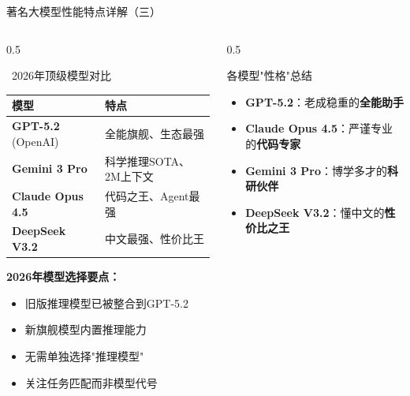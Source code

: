 \documentclass[aspectratio=169,11pt]{beamer}
\begin{document}
\begin{frame}{著名大模型性能特点详解（三）}
    \begin{columns}
        \begin{column}{0.5\textwidth}
            \begin{block}{\faFire\ 2026年顶级模型对比}
                \footnotesize
                \begin{tabular}{p{2.2cm}p{2.5cm}}
                    \toprule
                    \textbf{模型} & \textbf{特点} \\
                    \midrule
                    \textbf{GPT-5.2} (OpenAI) & 全能旗舰、生态最强 \\
                    \textbf{Gemini 3 Pro} & 科学推理SOTA、2M上下文 \\
                    \textbf{Claude Opus 4.5} & 代码之王、Agent最强 \\
                    \textbf{DeepSeek V3.2} & 中文最强、性价比王 \\
                    \bottomrule
                
                \end{tabular}
                \normalsize
                
                \vspace{0.3cm}
                \textbf{2026年模型选择要点：}
                \begin{itemize}
                    \item 旧版推理模型已被整合到GPT-5.2
                    \item 新旗舰模型内置推理能力
                    \item 无需单独选择"推理模型"
                    \item 关注任务匹配而非模型代号
                \end{itemize}
            \end{block}
        \end{column}
        \begin{column}{0.5\textwidth}
            \begin{alertblock}{各模型"性格"总结}
                \begin{itemize}
                    \item \textbf{GPT-5.2}：老成稳重的\textbf{全能助手}
                    \item \textbf{Claude Opus 4.5}：严谨专业的\textbf{代码专家}
                    \item \textbf{Gemini 3 Pro}：博学多才的\textbf{科研伙伴}
                    \item \textbf{DeepSeek V3.2}：懂中文的\textbf{性价比之王}
                \end{itemize}
            \end{alertblock}
            

\end{column}
\end{columns}
\end{frame}
\end{document}
